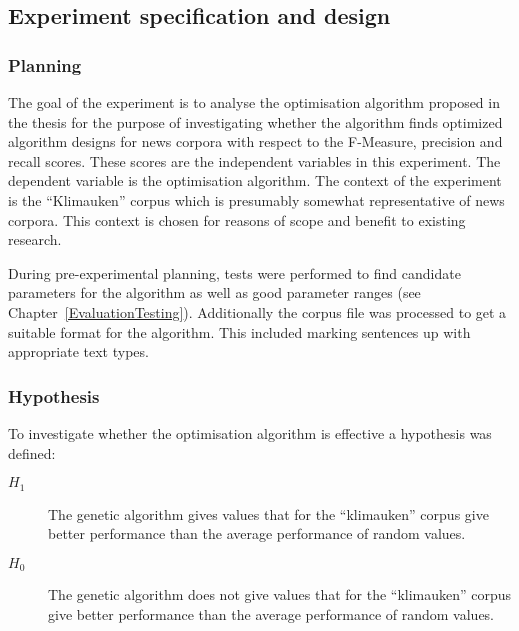 \subsection{Experiment specification and design}

\subsubsection{Planning}
The goal of the experiment is to analyse the optimisation algorithm proposed in the thesis for the purpose of investigating whether the algorithm finds optimized algorithm designs for news corpora  with respect to the F-Measure, precision and recall scores. These scores are the independent variables in this experiment. The dependent variable is the optimisation algorithm. The context of the experiment is the ``Klimauken'' corpus which is presumably somewhat representative of news corpora. This context is chosen for reasons of scope and benefit to existing research.

During pre-experimental planning, tests were performed to find candidate parameters for the algorithm as well as good parameter ranges (see Chapter~\ref{EvaluationTesting}). Additionally the corpus file was processed to get a suitable format for the \CTC algorithm. This included marking sentences up with appropriate text types.

\subsubsection{Hypothesis}

To investigate whether the optimisation algorithm is effective a hypothesis was defined:

	\begin{description}
	\item [\(H_{1}\)] The genetic algorithm gives values that for the ``klimauken'' corpus give better performance than the average performance of random values.
	\item [\(H_{0}\)] The genetic algorithm does not give values that for the ``klimauken'' corpus give better performance than the average performance of random values.
	\end{description}

